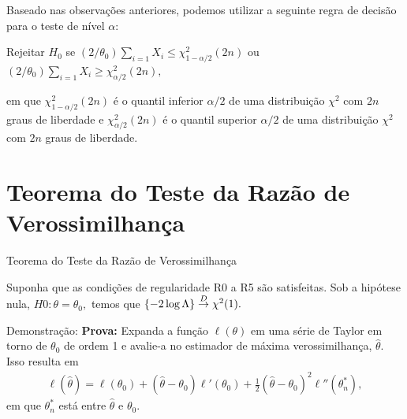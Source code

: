 \documentclass[12pt]{beamer}
\begin{document}
\begin{frame}{}
\begin{block}{}
\justifying
Baseado nas observações anteriores, podemos utilizar a seguinte regra de decisão para o teste de nível $\alpha$:
\end{block}
\pause
\begin{block}{}
\justifying
Rejeitar $H_0$ se $(2/\theta_0) \sum_{i=1} X_i \leq \chi^2_{1-\alpha/2}(2n)$ ou $(2/\theta_0) \sum_{i=1} X_i \geq \chi^2_{\alpha/2}(2n),$
\end{block}
\begin{block}{}
\justifying
em que $\chi^2_{1-\alpha/2}(2n)$ é o quantil inferior $\alpha/2$ de uma distribuição $\chi^2$ com $2n$ graus de liberdade e $\chi^2_{\alpha/2}(2n)$ é o quantil superior $\alpha/2$ de uma distribuição $\chi^2$ com $2n$ graus de liberdade.
\end{block}
\end{frame}


\section{Teorema do Teste da Razão de Verossimilhança}
\begin{frame}{Teorema do Teste da Razão de Verossimilhança}
\begin{Teorema}
\justifying
Suponha que as condições de regularidade R0 a R5 são satisfeitas. Sob a hipótese nula, $H0: \theta = \theta_0,$ temos que $\{-2 \log \Lambda\} \overset{D}{\rightarrow} \chi^2(1).$
\end{Teorema}
\pause
\begin{block}{Demonstração:}
\justifying
\textbf{Prova:} Expanda a função $\ell(\theta)$ em uma série de Taylor em torno de $\theta_0$ de ordem 1 e avalie-a no estimador de máxima verossimilhança, $\hat{\theta}$. Isso resulta em
\begin{align}\label{6.3.8}
    \ell(\hat{\theta}) = \ell(\theta_{0}) + (\hat{\theta} - \theta_0)\ell'(\theta_{0}) + \frac{1}{2}(\hat{\theta} - \theta_0)^2 \ell''(\theta^{*}_{n}),
\end{align}
em que $\theta^*_n$ está entre $\hat{\theta}$ e $\theta_0.$
\end{block}
\end{frame}
\end{document}

